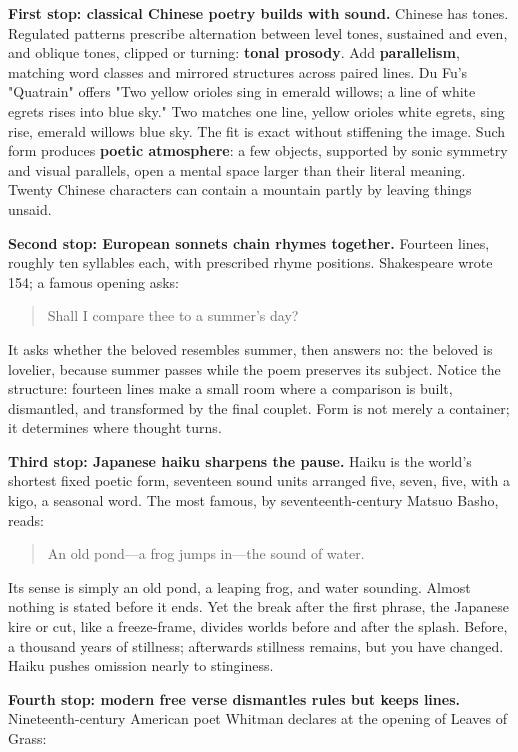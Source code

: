 \textbf{First stop: classical Chinese poetry builds with sound.} Chinese has tones. Regulated patterns prescribe alternation between level tones, sustained and even, and oblique tones, clipped or turning: \textbf{tonal prosody}. Add \textbf{parallelism}, matching word classes and mirrored structures across paired lines. Du Fu's "Quatrain" offers "Two yellow orioles sing in emerald willows; a line of white egrets rises into blue sky." Two matches one line, yellow orioles white egrets, sing rise, emerald willows blue sky. The fit is exact without stiffening the image. Such form produces \textbf{poetic atmosphere}: a few objects, supported by sonic symmetry and visual parallels, open a mental space larger than their literal meaning. Twenty Chinese characters can contain a mountain partly by leaving things unsaid.

\textbf{Second stop: European sonnets chain rhymes together.} Fourteen lines, roughly ten syllables each, with prescribed rhyme positions. Shakespeare wrote 154; a famous opening asks:

\begin{quote}
Shall I compare thee to a summer's day?
\end{quote}
It asks whether the beloved resembles summer, then answers no: the beloved is lovelier, because summer passes while the poem preserves its subject. Notice the structure: fourteen lines make a small room where a comparison is built, dismantled, and transformed by the final couplet. Form is not merely a container; it determines where thought turns.

\textbf{Third stop: Japanese haiku sharpens the pause.} Haiku is the world's shortest fixed poetic form, seventeen sound units arranged five, seven, five, with a kigo, a seasonal word. The most famous, by seventeenth-century Matsuo Basho, reads:

\begin{quote}
An old pond---a frog jumps in---the sound of water.
\end{quote}
Its sense is simply an old pond, a leaping frog, and water sounding. Almost nothing is stated before it ends. Yet the break after the first phrase, the Japanese kire or cut, like a freeze-frame, divides worlds before and after the splash. Before, a thousand years of stillness; afterwards stillness remains, but you have changed. Haiku pushes omission nearly to stinginess.

\textbf{Fourth stop: modern free verse dismantles rules but keeps lines.} Nineteenth-century American poet Whitman declares at the opening of Leaves of Grass:

